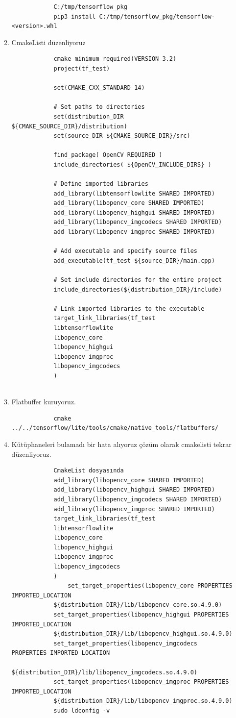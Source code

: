 \documentclass[12pt,a4paper]{article}
\begin{document}
\begin{enumerate}
\begin{enumerate}
\begin{verbatim}
		    C:/tmp/tensorflow_pkg
			pip3 install C:/tmp/tensorflow_pkg/tensorflow-<version>.whl
		\end{verbatim}
		
		\item CmakeListi düzenliyoruz
		\begin{verbatim}
			cmake_minimum_required(VERSION 3.2)
			project(tf_test)
			
			set(CMAKE_CXX_STANDARD 14)
			
			# Set paths to directories
			set(distribution_DIR ${CMAKE_SOURCE_DIR}/distribution)
			set(source_DIR ${CMAKE_SOURCE_DIR}/src)
			
			find_package( OpenCV REQUIRED )
			include_directories( ${OpenCV_INCLUDE_DIRS} )
			
			# Define imported libraries
			add_library(libtensorflowlite SHARED IMPORTED)
			add_library(libopencv_core SHARED IMPORTED)
			add_library(libopencv_highgui SHARED IMPORTED)
			add_library(libopencv_imgcodecs SHARED IMPORTED)
			add_library(libopencv_imgproc SHARED IMPORTED)
			
			# Add executable and specify source files
			add_executable(tf_test ${source_DIR}/main.cpp)
			
			# Set include directories for the entire project
			include_directories(${distribution_DIR}/include)
			
			# Link imported libraries to the executable
			target_link_libraries(tf_test
			libtensorflowlite
			libopencv_core
			libopencv_highgui
			libopencv_imgproc
			libopencv_imgcodecs
			)
			
		\end{verbatim}
		\item Flatbuffer kuruyoruz.
		\begin{verbatim}
			cmake ../../tensorflow/lite/tools/cmake/native_tools/flatbuffers/
		\end{verbatim}
		\item Kütüphaneleri bulamadı bir hata alıyoruz çözüm olarak cmakelisti tekrar düzenliyoruz.
		\begin{verbatim}
			CmakeList dosyasında
			add_library(libopencv_core SHARED IMPORTED)
			add_library(libopencv_highgui SHARED IMPORTED)
			add_library(libopencv_imgcodecs SHARED IMPORTED)
			add_library(libopencv_imgproc SHARED IMPORTED)
			target_link_libraries(tf_test
			libtensorflowlite
			libopencv_core
			libopencv_highgui
			libopencv_imgproc
			libopencv_imgcodecs
			)
				set_target_properties(libopencv_core PROPERTIES IMPORTED_LOCATION
			${distribution_DIR}/lib/libopencv_core.so.4.9.0)
			set_target_properties(libopencv_highgui PROPERTIES IMPORTED_LOCATION
			${distribution_DIR}/lib/libopencv_highgui.so.4.9.0)
			set_target_properties(libopencv_imgcodecs PROPERTIES IMPORTED_LOCATION
			${distribution_DIR}/lib/libopencv_imgcodecs.so.4.9.0)
			set_target_properties(libopencv_imgproc PROPERTIES IMPORTED_LOCATION
			${distribution_DIR}/lib/libopencv_imgproc.so.4.9.0)
			sudo ldconfig -v
		

\end{verbatim}
\end{enumerate}
\end{enumerate}
\end{document}
